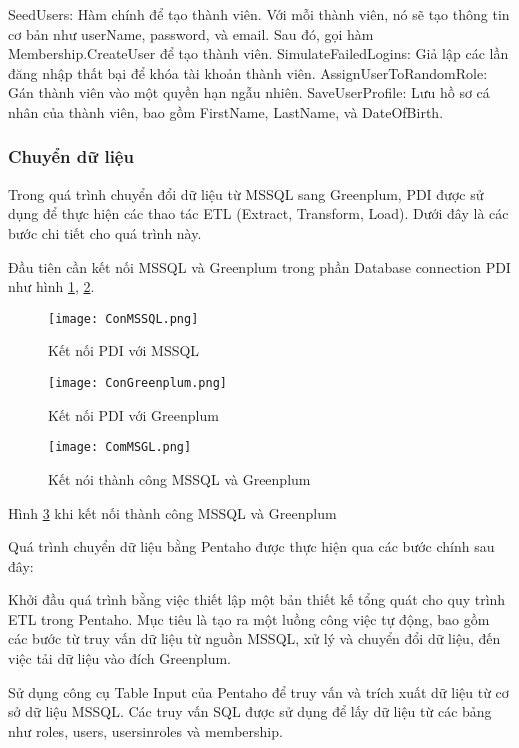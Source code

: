 SeedUsers: Hàm chính để tạo thành viên. Với mỗi thành viên, nó sẽ tạo thông tin cơ bản như userName, password, và email. Sau đó, gọi hàm Membership.CreateUser để tạo thành viên.
SimulateFailedLogins: Giả lập các lần đăng nhập thất bại để khóa tài khoản thành viên.
AssignUserToRandomRole: Gán thành viên vào một quyền hạn ngẫu nhiên.
SaveUserProfile: Lưu hồ sơ cá nhân của thành viên, bao gồm FirstName, LastName, và DateOfBirth.

\subsubsection{Chuyển dữ liệu}

Trong quá trình chuyển đổi dữ liệu từ MSSQL sang Greenplum, PDI được sử dụng để thực hiện các thao tác ETL (Extract, Transform, Load). Dưới đây là các bước chi tiết cho quá trình này.

Đầu tiên cần kết nối MSSQL và Greenplum trong phần Database connection PDI như hình \ref{fig:ConMSSQL}, \ref{fig:ConGreenplum}.


\begin{figure}
    \centering
    \texttt{[image: ConMSSQL.png]}
    \caption{Kết nối PDI với MSSQL}
    \label{fig:ConMSSQL}
\end{figure}


\begin{figure}
    \centering
    \texttt{[image: ConGreenplum.png]}
    \caption{Kết nối PDI với Greenplum}
    \label{fig:ConGreenplum}
\end{figure}

\begin{figure}
    \centering
    \texttt{[image: ComMSGL.png]}
    \caption{Kết nói thành công MSSQL và Greenplum}
    \label{fig:ComMSGL}
\end{figure}



Hình \ref{fig:ComMSGL} khi kết nối thành công MSSQL và Greenplum 


Quá trình chuyển dữ liệu bằng Pentaho được thực hiện qua các bước chính sau đây:

Khởi đầu quá trình bằng việc thiết lập một bản thiết kế tổng quát cho quy trình ETL trong Pentaho. Mục tiêu là tạo ra một luồng công việc tự động, bao gồm các bước từ truy vấn dữ liệu từ nguồn MSSQL, xử lý và chuyển đổi dữ liệu, đến việc tải dữ liệu vào đích Greenplum.

Sử dụng công cụ Table Input của Pentaho để truy vấn và trích xuất dữ liệu từ cơ sở dữ liệu MSSQL. Các truy vấn SQL được sử dụng để lấy dữ liệu từ các bảng như roles, users, usersinroles và membership.

